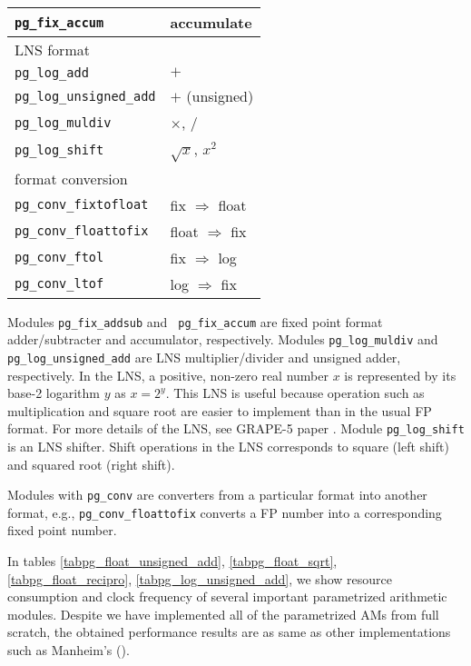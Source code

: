 \documentclass{llncs}
\begin{document}
\begin{table}
\begin{center}
\begin{minipage}{.45\linewidth}
\begin{tabular}{ll}
	{\tt pg\_fix\_accum}           &  accumulate\\
	\hline
	LNS format& \\
	\hline
	{\tt pg\_log\_add}             &  $+$\\
	{\tt pg\_log\_unsigned\_add}   &  $+$ (unsigned)\\
	{\tt pg\_log\_muldiv}          &  $\times$, $/$\\
	{\tt pg\_log\_shift}           &  $\sqrt{x}$, $x^2$\\
	\hline
	format conversion & \\
	\hline
	{\tt pg\_conv\_fixtofloat}     &  fix $\Rightarrow$ float\\
	{\tt pg\_conv\_floattofix}     &  float $\Rightarrow$ fix\\
	{\tt pg\_conv\_ftol}           &  fix $\Rightarrow$ log\\
	{\tt pg\_conv\_ltof}           &  log $\Rightarrow$ fix\\
	\hline
      \end{tabular}
    \end{minipage}
  \end{center}
  \label{tabpgmod}
\end{table}

Modules {\tt pg\_fix\_addsub} and {\tt
pg\_fix\_accum} are fixed point format adder/subtracter and
accumulator, respectively.  Modules {\tt pg\_log\_muldiv} and {\tt
pg\_log\_unsigned\_add} are LNS multiplier/divider and
unsigned adder, respectively.
In the LNS, a positive,
non-zero real number $x$ is represented by its base-2 logarithm $y$ as
$x=2^{y}$.
This LNS is useful because operation such as multiplication and square root
are easier to implement than in the usual FP format.
For more details of the LNS, see GRAPE-5 paper
\cite{KFMT00}.
Module {\tt pg\_log\_shift} is an LNS shifter.
Shift operations in the LNS corresponds to
square (left shift) and squared root (right shift). 

Modules with {\tt pg\_conv} are converters from a particular format
into another format, e.g., {\tt pg\_conv\_floattofix} converts
a FP number into a corresponding fixed point number.

In tables \ref{tabpg_float_unsigned_add},
\ref{tabpg_float_sqrt}, \ref{tabpg_float_recipro},
\ref{tabpg_log_unsigned_add}, we show
resource consumption and clock frequency of several important
parametrized arithmetic modules.
Despite we have implemented all of the parametrized AMs
from full scratch, the obtained performance results
are as same as other implementations such as Manheim's (\cite{LKM02}).
\end{document}
